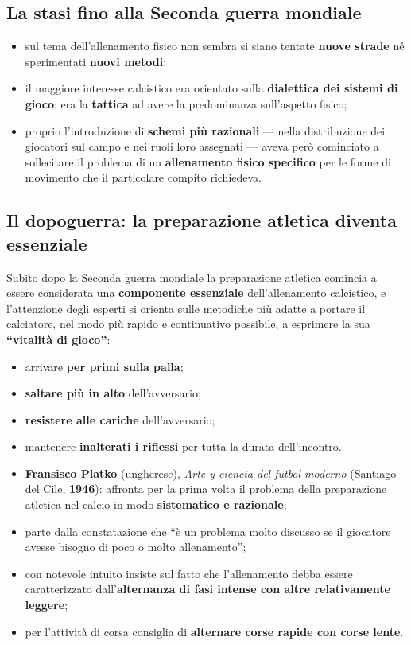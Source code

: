 \subsection{La stasi fino alla Seconda guerra mondiale}

\begin{itemize}
  \item sul tema dell'allenamento fisico non sembra si siano tentate \textbf{nuove strade} né
    sperimentati \textbf{nuovi metodi};
  \item il maggiore interesse calcistico era orientato sulla \textbf{dialettica dei sistemi di
    gioco}: era la \textbf{tattica} ad avere la predominanza sull'aspetto fisico;
  \item proprio l'introduzione di \textbf{schemi più razionali} --- nella distribuzione dei
    giocatori sul campo e nei ruoli loro assegnati --- aveva però cominciato a sollecitare il
    problema di un \textbf{allenamento fisico specifico} per le forme di movimento che il
    particolare compito richiedeva.
\end{itemize}

\subsection{Il dopoguerra: la preparazione atletica diventa essenziale}

Subito dopo la Seconda guerra mondiale la preparazione atletica comincia a essere considerata una
\textbf{componente essenziale} dell'allenamento calcistico, e l'attenzione degli esperti si orienta
sulle metodiche più adatte a portare il calciatore, nel modo più rapido e continuativo possibile, a
esprimere la sua \textbf{``vitalità di gioco''}:

\begin{itemize}
  \item arrivare \textbf{per primi sulla palla};
  \item \textbf{saltare più in alto} dell'avversario;
  \item \textbf{resistere alle cariche} dell'avversario;
  \item mantenere \textbf{inalterati i riflessi} per tutta la durata dell'incontro.
\end{itemize}

\begin{itemize}
  \item \textbf{Fransisco Platko} (ungherese), \textit{Arte y ciencia del futbol moderno} (Santiago
    del Cile, \textbf{1946}): affronta per la prima volta il problema della preparazione atletica
    nel calcio in modo \textbf{sistematico e razionale};
  \item parte dalla constatazione che ``è un problema molto discusso se il giocatore avesse bisogno
    di poco o molto allenamento'';
  \item con notevole intuito insiste sul fatto che l'allenamento debba essere caratterizzato
    dall'\textbf{alternanza di fasi intense con altre relativamente leggere};
  \item per l'attività di corsa consiglia di \textbf{alternare corse rapide con corse lente}.
\end{itemize}


